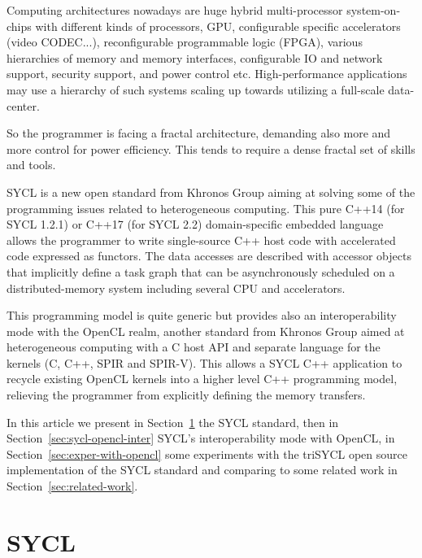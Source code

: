 \documentclass[sigplan, review, authordraft]{acmart}
\begin{document}
Computing architectures nowadays are huge hybrid multi-processor
system-on-chips with different kinds of processors, GPU, configurable
specific accelerators (video CODEC...), reconfigurable programmable
logic (FPGA), various hierarchies of memory and memory interfaces,
configurable IO and network support, security support, and power control
etc. High-performance applications may use a hierarchy of such systems
scaling up towards utilizing a full-scale data-center.

So the programmer is facing a fractal architecture, demanding
also more and more control for power efficiency. This tends to require
a dense fractal set of skills and tools.

SYCL \cite{SYCL-1.2.1,SYCL-2.2-provisional} is a new open standard
from Khronos Group aiming at solving some of the programming issues
related to heterogeneous computing.  This pure C++14 (for SYCL 1.2.1)
or C++17 (for SYCL 2.2) domain-specific embedded language allows the
programmer to write single-source C++ host code with accelerated code
expressed as functors. The data accesses are described with accessor
objects that implicitly define a task graph that can be asynchronously
scheduled on a distributed-memory system including several CPU and
accelerators.

This programming model is quite generic but provides also an
interoperability mode with the OpenCL realm, another standard from
Khronos Group aimed at heterogeneous computing with a C host API and
separate language for the kernels (C, C++, SPIR and SPIR-V).  This
allows a SYCL C++ application to recycle existing OpenCL kernels into
a higher level C++ programming model, relieving the programmer from
explicitly defining the memory transfers.

In this article we present in Section~\ref{sec:sycl} the SYCL
standard, then in Section~\ref{sec:sycl-opencl-inter} SYCL's interoperability mode with OpenCL, in
Section~\ref{sec:exper-with-opencl} some experiments with the
triSYCL open source implementation of the SYCL standard and comparing
to some related work in Section~\ref{sec:related-work}.


\section{SYCL}
\label{sec:sycl}
\end{document}
